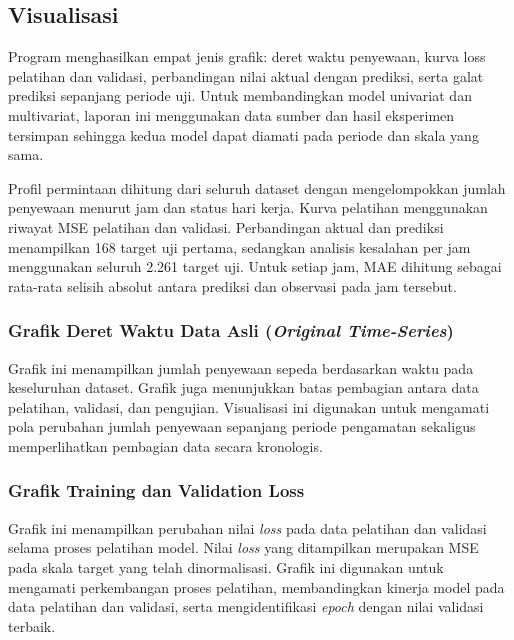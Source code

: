 \documentclass[10pt,conference]{IEEEtran}
\begin{document}
\subsection{Visualisasi}

Program menghasilkan empat jenis grafik: deret waktu penyewaan, kurva loss pelatihan dan validasi, perbandingan nilai aktual dengan prediksi, serta galat prediksi sepanjang periode uji. Untuk membandingkan model univariat dan multivariat, laporan ini menggunakan data sumber dan hasil eksperimen tersimpan sehingga kedua model dapat diamati pada periode dan skala yang sama.

Profil permintaan dihitung dari seluruh dataset dengan mengelompokkan jumlah penyewaan menurut jam dan status hari kerja. Kurva pelatihan menggunakan riwayat MSE pelatihan dan validasi. Perbandingan aktual dan prediksi menampilkan 168 target uji pertama, sedangkan analisis kesalahan per jam menggunakan seluruh 2.261 target uji. Untuk setiap jam, MAE dihitung sebagai rata-rata selisih absolut antara prediksi dan observasi pada jam tersebut.

\subsubsection{Grafik Deret Waktu Data Asli (\textit{Original Time-Series})}
\leavevmode\par\nopagebreak

Grafik ini menampilkan jumlah penyewaan sepeda berdasarkan waktu pada keseluruhan dataset. Grafik juga menunjukkan batas pembagian antara data pelatihan, validasi, dan pengujian. Visualisasi ini digunakan untuk mengamati pola perubahan jumlah penyewaan sepanjang periode pengamatan sekaligus memperlihatkan pembagian data secara kronologis.

\subsubsection{Grafik Training dan Validation Loss}
\leavevmode\par\nopagebreak

Grafik ini menampilkan perubahan nilai \textit{loss} pada data pelatihan dan validasi selama proses pelatihan model. Nilai \textit{loss} yang ditampilkan merupakan MSE pada skala target yang telah dinormalisasi. Grafik ini digunakan untuk mengamati perkembangan proses pelatihan, membandingkan kinerja model pada data pelatihan dan validasi, serta mengidentifikasi \textit{epoch} dengan nilai validasi terbaik.
\end{document}
